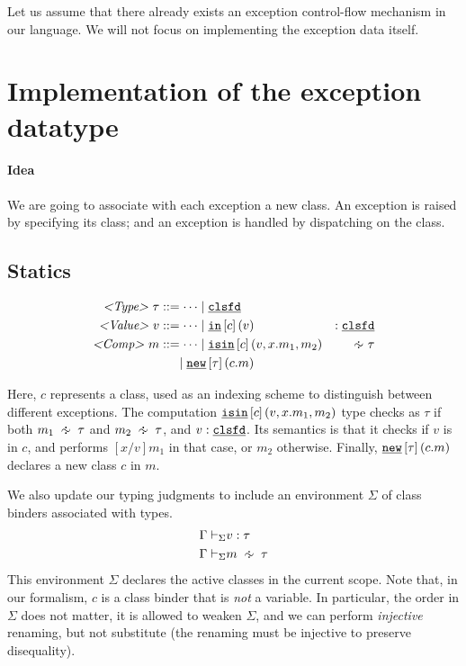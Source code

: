 \documentclass[ manuscript,screen, nonacm]{acmart}
\begin{document}
Let us assume that there already exists an exception control-flow mechanism in our language.
We will not focus on implementing the exception data itself.

\section{Implementation of the exception datatype}

\paragraph{Idea} We are going to associate with each exception  a new class. 
An exception is raised by specifying its class;
and an exception is handled by dispatching on the class.

\subsection{Statics}

\begin{align*}
    \textrm{\emph{<Type>}}~\tau &::= \cdots \mid \clsfd\\
    \textrm{\emph{<Value>}}~v &::= \cdots \mid \inharp{c}{v} \quad\quad & :\clsfd\\
    \textrm{\emph{<Comp>}}~m &::= \cdots \mid \isin{c}{v}{x.m_1}{m_2} &\approxty \tau\\
    &\phantom{::=} \mid \new{\tau}{c.m}
\end{align*}

Here, 
\(c\) represents a class, 
used as an indexing scheme to distinguish between different exceptions. 
The computation \(\underline{\mathtt{isin}}\left[c\right](v,x.m_1,m_2)\) type checks as \(\tau\) 
if both \(m_1 \approxty \tau\)
and \(m_2 \approxty \tau\), 
and \(v : \underline{\mathtt{clsfd}}\). 
Its semantics is that it checks 
if \(v\) is in \(c\), and performs \([x/v]m_1\) in that case, or \(m_2\) otherwise.
Finally, \(\underline{\mathtt{new}}\left[\tau\right](c.m)\) declares a new class \(c\) in \(m\).

We also update our typing judgments to include an environment \(\Sigma\) of class binders associated with types.
\begin{align*}
    \Gamma \vdash_{\Sigma}& v : \tau\\
    \Gamma \vdash_{\Sigma}& m \approxty \tau
\end{align*}
This environment \(\Sigma\) declares the active classes in the current scope.
Note that, in our formalism, \(c\) is a class binder that is \emph{not} a variable.
In particular, the order in \(\Sigma\) does not matter, it is allowed to weaken \(\Sigma\),
and we can perform \emph{injective} renaming, but not substitute (the renaming must be
injective to preserve disequality).
\end{document}
